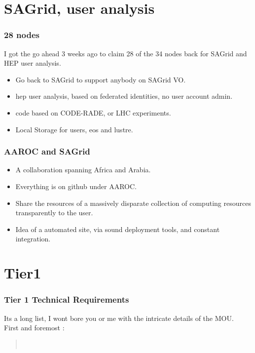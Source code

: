 \documentclass{beamer}
\begin{document}
\section{SAGrid, user analysis}
\begin{frame}
\frametitle{28 nodes}
I got the go ahead 3 weeks ago to claim 28 of the 34 nodes back for SAGrid and HEP user analysis.
\begin{itemize}
  \item Go back to SAGrid to support anybody on SAGrid VO.
  \item hep user analysis, based on federated identities, no user account admin.
  \item code based on CODE-RADE, or LHC experiments.
  \item Local Storage for users, eos and lustre.
\end{itemize}
\end{frame}


\begin{frame}
\frametitle{AAROC and SAGrid}
\begin{itemize}
  \item A collaboration spanning Africa and Arabia.\\
  \item Everything is on github under AAROC.\\
  \item Share the resources of a massively disparate collection of computing resources transparently to the user.\\
  \item Idea of a automated site, via sound deployment tools, and constant integration.
\end{itemize}
\end{frame}

\section{Tier1}

\begin{frame}
\frametitle{Tier 1 Technical Requirements} 
Its a long list, I wont bore you or me with the intricate details of the MOU.\\
First and foremost :\\
\begin{quote}
  \\
\end{quote}
\end{frame}
\end{document}
